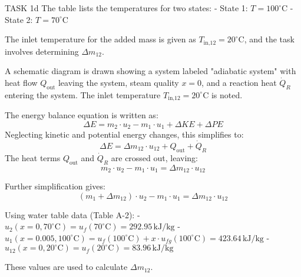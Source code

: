 TASK 1d  
The table lists the temperatures for two states:  
- State 1: \( T = 100^\circ\text{C} \)  
- State 2: \( T = 70^\circ\text{C} \)  

The inlet temperature for the added mass is given as \( T_{\text{in,12}} = 20^\circ\text{C} \), and the task involves determining \( \Delta m_{12} \).  

A schematic diagram is drawn showing a system labeled "adiabatic system" with heat flow \( Q_{\text{out}} \) leaving the system, steam quality \( x = 0 \), and a reaction heat \( \dot{Q}_R \) entering the system. The inlet temperature \( T_{\text{in,12}} = 20^\circ\text{C} \) is noted.  

The energy balance equation is written as:  
\[
\Delta E = m_2 \cdot u_2 - m_1 \cdot u_1 + \Delta KE + \Delta PE  
\]  
Neglecting kinetic and potential energy changes, this simplifies to:  
\[
\Delta E = \Delta m_{12} \cdot u_{12} + Q_{\text{out}} + \dot{Q}_R  
\]  
The heat terms \( Q_{\text{out}} \) and \( \dot{Q}_R \) are crossed out, leaving:  
\[
m_2 \cdot u_2 - m_1 \cdot u_1 = \Delta m_{12} \cdot u_{12}  
\]  

Further simplification gives:  
\[
(m_1 + \Delta m_{12}) \cdot u_2 - m_1 \cdot u_1 = \Delta m_{12} \cdot u_{12}  
\]  

Using water table data (Table A-2):  
- \( u_2(x = 0, 70^\circ\text{C}) = u_f(70^\circ\text{C}) = 292.95 \, \text{kJ/kg} \)  
- \( u_1(x = 0.005, 100^\circ\text{C}) = u_f(100^\circ\text{C}) + x \cdot u_{fg}(100^\circ\text{C}) = 423.64 \, \text{kJ/kg} \)  
- \( u_{12}(x = 0, 20^\circ\text{C}) = u_f(20^\circ\text{C}) = 83.96 \, \text{kJ/kg} \)  

These values are used to calculate \( \Delta m_{12} \).